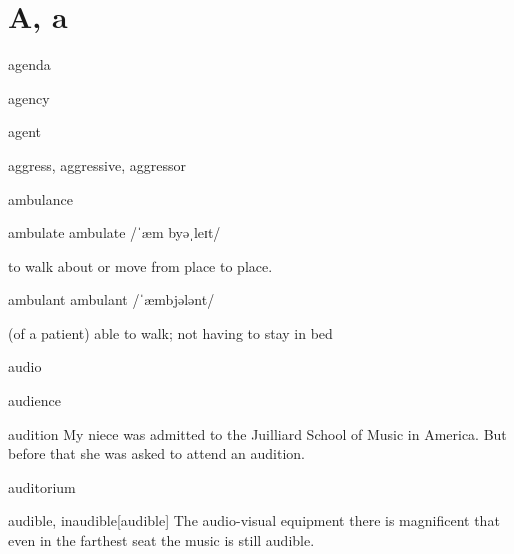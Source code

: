 \section{A, a}

\begin{word}{agenda}
\end{word}

\begin{word}{agency}
\end{word}

\begin{word}{agent}
\end{word}

\begin{word}{aggress, aggressive, aggressor}
\end{word}

\begin{word}{ambulance}
\end{word}

\begin{word}{ambulate} 
    ambulate /ˈæm byəˌleɪt/
    
    to walk about or move from place to place.
\end{word}

\begin{word}{ambulant} 
    ambulant /ˈæmbjələnt/
    
    (of a patient) able to walk; not having to stay in bed
\end{word}

\begin{word}{audio}
\end{word}

\begin{word}{audience}
\end{word}

\begin{word}{audition} 
    My  niece  was admitted  to  the Juilliard School of Music  in  America. But before that she was asked to attend an audition.
\end{word}

\begin{word}{auditorium}
\end{word}

\begin{word}{audible, inaudible}[audible]
    The audio-visual equipment there  is  magnificent that even  in the  farthest seat the music is still audible.
\end{word}


